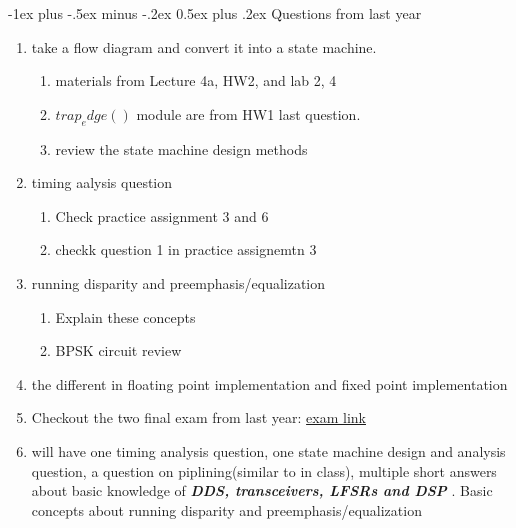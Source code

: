 \documentclass[10pt,landscape]{article}
\makeatletter
\renewcommand{\section}{\@startsection{section}{1}{0mm}%
                                {-1ex plus -.5ex minus -.2ex}%
                                {0.5ex plus .2ex}%
                                {\normalfont\large\bfseries}}
\theoremstyle{definition}
\makeatother
\begin{document}
\begin{multicols}{3}
\section{Questions from last year}
\begin{enumerate}
    \item take a flow diagram and convert it into a state machine. \\
        \begin{enumerate}
            \item materials from Lecture 4a, HW2, and lab 2, 4
            \item $trap_edge()$ module are from HW1 last question. 
            \item review the state machine design methods
        \end{enumerate}
    \item timing aalysis question \\
        \begin{enumerate}
            \item Check practice assignment 3 and 6
            \item checkk question 1 in practice assignemtn 3
        \end{enumerate}
    \item running disparity and preemphasis/equalization
        \begin{enumerate}
            \item Explain these concepts
            \item BPSK circuit review
        \end{enumerate}
    \item the different in floating point implementation and fixed point implementation
    \item Checkout the two final exam from last year:             \hyperlink{https://sites.google.com/site/ubccpen311winter2018term2/exam}{exam link} \\
    \item will have one timing analysis question, one state machine design and analysis         question, a question on piplining(similar to in class), multiple short answers about     basic knowledge of \textbf{\emph{DDS, transceivers, LFSRs and DSP} }. Basic concepts about running disparity and preemphasis/equalization
    
\end{enumerate}

\end{multicols}
\end{document}
